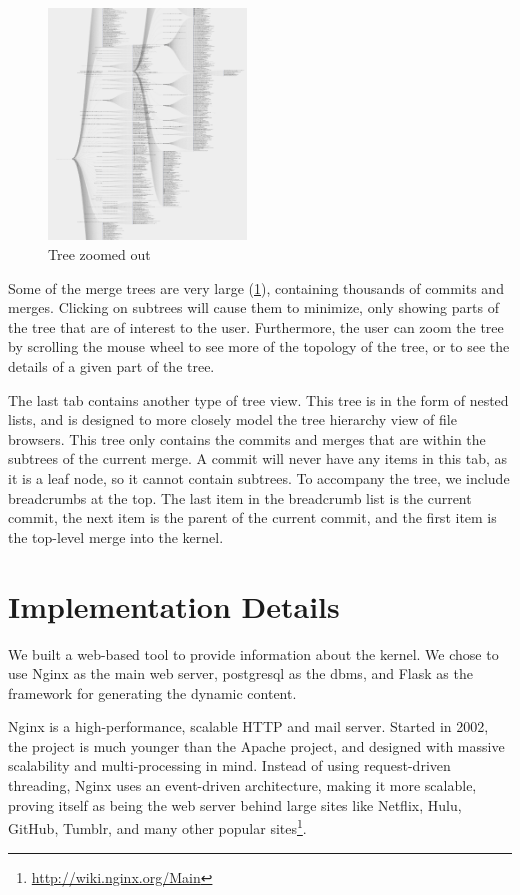 \documentclass[conference, draftclsnofoot]{IEEEtran}
\begin{document}
\begin{figure}[h]
	\centering
	\includegraphics[width=0.47\textwidth]{figures/tree_zoom.png}
	\caption{Tree zoomed out}
	\label{fig:zoomed_tree}
\end{figure}

Some of the merge trees are very large (\ref{fig:zoomed_tree}), containing
thousands of commits and merges. Clicking on subtrees will cause them to
minimize, only showing parts of the tree that are of interest to the user.
Furthermore, the user can zoom the tree by scrolling the mouse wheel to see
more of the topology of the tree, or to see the details of a given part of the
tree.

The last tab contains another type of tree view. This tree is in the form of
nested lists, and is designed to more closely model the tree hierarchy view of
file browsers. This tree only contains the commits and merges that are within
the subtrees of the current merge. A commit will never have any items in this
tab, as it is a leaf node, so it cannot contain subtrees. To accompany the
tree, we include breadcrumbs at the top. The last item in the breadcrumb list
is the current commit, the next item is the parent of the current commit, and
the first item is the top-level merge into the kernel.

\section{Implementation Details}
We built a web-based tool to provide information about the kernel.
We chose to use Nginx as the main web server, postgresql as the dbms, and Flask
as the framework for generating the dynamic content.

Nginx is a high-performance, scalable HTTP and mail server. Started in 2002,
the project is much younger than the Apache project, and designed with massive
scalability and multi-processing in mind. Instead of using request-driven
threading, Nginx uses an event-driven architecture, making it more scalable,
proving itself as being the web server behind large sites like Netflix, Hulu,
GitHub, Tumblr, and many other popular
sites\footnote{\url{http://wiki.nginx.org/Main}}.
\end{document}

